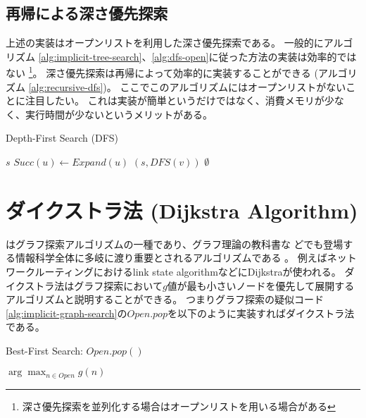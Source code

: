 \subsection{再帰による深さ優先探索}
\label{sec:recursive-depth-first-search}

上述の実装はオープンリストを利用した深さ優先探索である。
一般的にアルゴリズム \ref{alg:implicit-tree-search}、\ref{alg:dfs-open}に従った方法の実装は効率的ではない \footnote{深さ優先探索を並列化する場合はオープンリストを用いる場合がある}。
深さ優先探索は再帰によって効率的に実装することができる (アルゴリズム \ref{alg:recursive-dfs})。
ここでこのアルゴリズムにはオープンリストがないことに注目したい。
これは実装が簡単というだけではなく、消費メモリが少なく、実行時間が少ないというメリットがある。

\begin{algorithm}[tbh]
\caption{Depth-First Search (DFS)}
\label{alg:recursive-dfs}
	 {
		\Return $s$\;
	}
	$Succ(u) \leftarrow Expand(u)$\;
	 {
		 {
			\Return $(s, DFS(v))$
		}
	}
	\Return $\emptyset$\;
\end{algorithm}


\section{ダイクストラ法 (Dijkstra Algorithm)}
\label{sec:dijkstra}

はグラフ探索アルゴリズムの一種であり、グラフ理論の教科書な
どでも登場する情報科学全体に多岐に渡り重要とされるアルゴリズムである \cite{dijkstra1959note}。
例えばネットワークルーティングにおけるlink state algorithmなどにDijkstraが使われる\cite{mcquillan1980new}。
ダイクストラ法はグラフ探索において$g$値が最も小さいノードを優先して展開するアルゴリズムと説明することができる。
つまりグラフ探索の疑似コード\ref{alg:implicit-graph-search}の$Open.pop$を以下のように実装すればダイクストラ法である。

\begin{algorithm}[tbh]
\caption{Best-First Search: $Open.pop()$}
\label{alg:dfs-open}
	\Return $\arg \max_{n \in Open} g(n)$
\end{algorithm}

